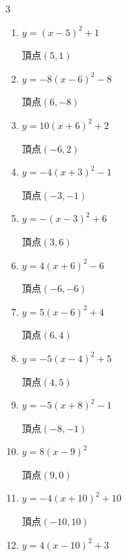 \begin{multicols}{3}
\begin{enumerate}
  \item $\displaystyle y=\left( x-5\right)^{2}+1$

        $\displaystyle 頂点\left( 5 , 1 \right)$

  \item $\displaystyle y=-8\left( x-6\right)^{2}-8$

        $\displaystyle 頂点\left( 6 , -8 \right)$

  \item $\displaystyle y=10\left( x+6\right)^{2}+2$

        $\displaystyle 頂点\left( -6 , 2 \right)$

  \item $\displaystyle y=-4\left( x+3\right)^{2}-1$

        $\displaystyle 頂点\left( -3 , -1 \right)$

  \item $\displaystyle y=-\left( x-3\right)^{2}+6$

        $\displaystyle 頂点\left( 3 , 6 \right)$

  \item $\displaystyle y=4\left( x+6\right)^{2}-6$

        $\displaystyle 頂点\left( -6 , -6 \right)$

  \item $\displaystyle y=5\left( x-6\right)^{2}+4$

        $\displaystyle 頂点\left( 6 , 4 \right)$

  \item $\displaystyle y=-5\left( x-4\right)^{2}+5$

        $\displaystyle 頂点\left( 4 , 5 \right)$

\columnbreak %

  \item $\displaystyle y=-5\left( x+8\right)^{2}-1$

        $\displaystyle 頂点\left( -8 , -1 \right)$

  \item $\displaystyle y=8\left( x-9\right)^{2}$

        $\displaystyle 頂点\left( 9 , 0 \right)$

  \item $\displaystyle y=-4\left( x+10\right)^{2}+10$

        $\displaystyle 頂点\left( -10 , 10 \right)$

  \item $\displaystyle y=4\left( x-10\right)^{2}+3$


\end{enumerate}
\end{multicols}
